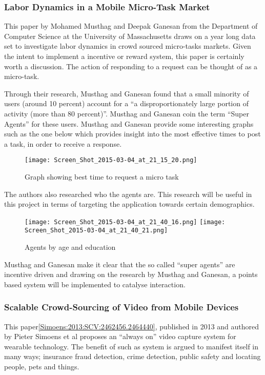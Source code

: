 \documentclass[a4paper]{article}
\begin{document}
\subsubsection{Labor Dynamics in a Mobile Micro-Task Market}
This paper by Mohamed Musthag and Deepak Ganesan from the Department of Computer Science at the University of Massachusetts draws on a year long data set to investigate labor dynamics in crowd sourced micro-tasks markets. Given the intent to implement a incentive or reward system, this paper is certainly worth a discussion. The action of responding to a request can be thought of as a micro-task.

Through their research, Musthag and Ganesan found that a small minority of users (around 10 percent) account for a ``a disproportionately
large portion of activity (more than 80 percent)''. Musthag and Ganesan coin the term ``Super Agents'' for these users.
Musthag and Ganesan provide some interesting graphs such as the one below which provides insight into the most effective times to post a task, in order to receive a response.
\begin{figure}[H]
\centering
\texttt{[image: Screen\_Shot\_2015-03-04\_at\_21\_15\_20.png]}
\caption{Graph showing best time to request a micro task}

\end{figure}
The authors also researched who the agents are. This research will be useful in this project in terms of targeting the application towards certain demographics.

\begin{figure}[H]
\centering
\texttt{[image: Screen\_Shot\_2015-03-04\_at\_21\_40\_16.png]}
\texttt{[image: Screen\_Shot\_2015-03-04\_at\_21\_40\_21.png]}
\caption{Agents by age and education}
\label{fig:agentsByAgeAndEd}
\end{figure}
Musthag and Ganesan make it clear that the so called ``super agents'' are incentive driven and drawing on the research by Musthag and Ganesan, a points based system will be implemented to catalyse interaction.

\subsubsection{Scalable Crowd-Sourcing of Video from Mobile Devices } 
This paper\ref{Simoens:2013:SCV:2462456.2464440}, published in 2013 and authored by Pieter Simoens et al proposes an ``always on'' video capture system for wearable technology. The benefit of such as system is argued to manifest itself in many ways; insurance fraud detection, crime detection, public safety and locating people, pets and things.
\end{document}
